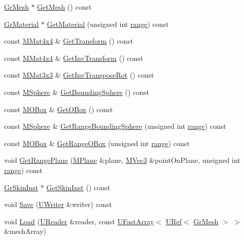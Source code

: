 \begin{CompactItemize}
\hyperlink{class_gr_mesh}{GrMesh} $\ast$ \hyperlink{class_gr_mesh_inst_afe9b877585d9b86d1f464595b65e91c}{GetMesh} () const 
\item 
\hyperlink{class_gr_material}{GrMaterial} $\ast$ \hyperlink{class_gr_mesh_inst_b9f9406eba85a291edbbe2e9bf0a07bd}{GetMaterial} (unsigned int \hyperlink{glext__bak_8h_7b8ad0b27a927682837f95528fa454f5}{range}) const 
\item 
const \hyperlink{class_m_mat4x4}{MMat4x4} \& \hyperlink{class_gr_mesh_inst_bc956297c8b4dc6cae1e16f04f949bf6}{GetTransform} () const 
\item 
const \hyperlink{class_m_mat4x4}{MMat4x4} \& \hyperlink{class_gr_mesh_inst_34b8224971a8f2756d1eadb4af5e9124}{GetInvTransform} () const 
\item 
const \hyperlink{class_m_mat3x3}{MMat3x3} \& \hyperlink{class_gr_mesh_inst_ffeb25d628443c633d75de24cc236355}{GetInvTransposeRot} () const 
\item 
const \hyperlink{class_m_sphere}{MSphere} \& \hyperlink{class_gr_mesh_inst_1990762b53bf2a9b8bfdf205606d160b}{GetBoundingSphere} () const 
\item 
const \hyperlink{class_m_o_box}{MOBox} \& \hyperlink{class_gr_mesh_inst_c73cc039d7f4221dfb637efce6431d3e}{GetOBox} () const 
\item 
const \hyperlink{class_m_sphere}{MSphere} \& \hyperlink{class_gr_mesh_inst_e5687fcc93bae7444ae3d2be48ca5dea}{GetRangeBoundingSphere} (unsigned int \hyperlink{glext__bak_8h_7b8ad0b27a927682837f95528fa454f5}{range}) const 
\item 
const \hyperlink{class_m_o_box}{MOBox} \& \hyperlink{class_gr_mesh_inst_13b6763be580263b74c247723329d226}{GetRangeOBox} (unsigned int \hyperlink{glext__bak_8h_7b8ad0b27a927682837f95528fa454f5}{range}) const 
\item 
void \hyperlink{class_gr_mesh_inst_338043d8bfbf7e611c6770bacc83cb2a}{GetRangePlane} (\hyperlink{class_m_plane}{MPlane} \&plane, \hyperlink{class_m_vec3}{MVec3} \&pointOnPlane, unsigned int \hyperlink{glext__bak_8h_7b8ad0b27a927682837f95528fa454f5}{range}) const 
\item 
\hyperlink{class_gr_skin_inst}{GrSkinInst} $\ast$ \hyperlink{class_gr_mesh_inst_08eab6fa5c82f0c5a0b1bbe86f4f6dac}{GetSkinInst} () const 
\item 
void \hyperlink{class_gr_mesh_inst_9cafeacbe639f49a1e379df6a675cc34}{Save} (\hyperlink{class_u_writer}{UWriter} \&writer) const 
\item 
void \hyperlink{class_gr_mesh_inst_4f5bd87c312707f1c3b4f04f30eeb06a}{Load} (\hyperlink{class_u_reader}{UReader} \&reader, const \hyperlink{class_u_fast_array}{UFastArray}$<$ \hyperlink{class_u_ref}{URef}$<$ \hyperlink{class_gr_mesh}{GrMesh} $>$ $>$ \&meshArray)

\end{CompactItemize}
